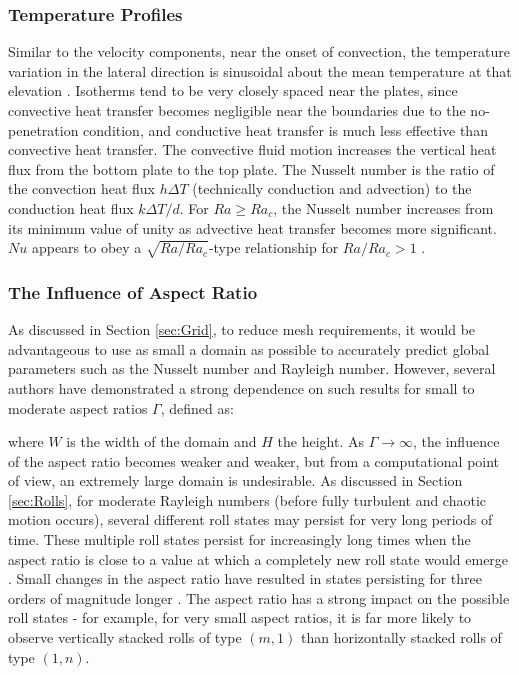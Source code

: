 \documentclass[10pt]{article}
\numberwithin{equation}{section} %
\begin{document}
\subsubsection{Temperature Profiles}
Similar to the velocity components, near the onset of convection, the temperature variation in the lateral direction is sinusoidal about the mean temperature at that elevation \cite{berge}. Isotherms tend to be very closely spaced near the plates, since convective heat transfer becomes negligible near the boundaries due to the no-penetration condition, and conductive heat transfer is much less effective than convective heat transfer. The convective fluid motion increases the vertical heat flux from the bottom plate to the top plate. The Nusselt number is the ratio of the convection heat flux \(h\Delta T\) (technically conduction and advection) to the conduction heat flux \(k\Delta T/d\). For \(Ra\ge Ra_c\), the Nusselt number increases from its minimum value of unity as advective heat transfer becomes more significant. \(Nu\) appears to obey a \(\sqrt{Ra/Ra_c}\)-type relationship for \(Ra/Ra_c>1\) \cite{berge}.

\subsubsection{The Influence of Aspect Ratio}

As discussed in Section \ref{sec:Grid}, to reduce mesh requirements, it would be advantageous to use as small a domain as possible to accurately predict global parameters such as the Nusselt number and Rayleigh number. However, several authors have demonstrated a strong dependence on such results for small to moderate aspect ratios \(\Gamma\), defined as:

\beq
\Gamma\equiv{}
\eeq

where \(W\) is the width of the domain and \(H\) the height. As \(\Gamma\rightarrow\infty\), the influence of the aspect ratio becomes weaker and weaker, but from a computational point of view, an extremely large domain is undesirable. As discussed in Section \ref{sec:Rolls}, for moderate Rayleigh numbers (before fully turbulent and chaotic motion occurs), several different roll states may persist for very long periods of time. These multiple roll states persist for increasingly long times when the aspect ratio is close to a value at which a completely new roll state would emerge \cite{poel}. Small changes in the aspect ratio have resulted in states persisting for three orders of magnitude longer \cite{poel}. The aspect ratio has a strong impact on the possible roll states - for example, for very small aspect ratios, it is far more likely to observe vertically stacked rolls of type \((m, 1)\) than horizontally stacked rolls of type \((1, n)\).
\end{document}
